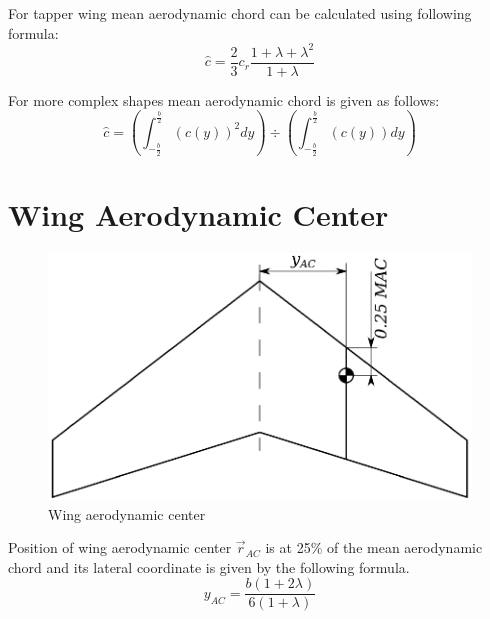 For tapper wing mean aerodynamic chord can be calculated using following formula: \cite{Corke2003, Galinski2016}
\begin{equation}
  \hat c = \frac{2}{3} c_r \frac{1+\lambda+\lambda^2}{1+\lambda}
\end{equation}

For more complex shapes mean aerodynamic chord is given as follows: \cite{Paturski02}
\begin{equation}
  \hat c = 
  \left(
    \int_{-\frac{b}{2}}^{\frac{b}{2}} \left( c \left( y \right) \right)^2 dy
  \right)
  \div
  \left(
    \int_{-\frac{b}{2}}^{\frac{b}{2}} \left( c \left( y \right) \right) dy
  \right)
\end{equation}

\section{Wing Aerodynamic Center}

\begin{figure}
  \centering
  \includegraphics[width=120mm]{eps/wing_aerodynamic_center.eps}
  \caption{Wing aerodynamic center}
\end{figure}

Position of wing aerodynamic center ${\vec r}_{AC}$ is at 25\% of the mean aerodynamic chord and its lateral coordinate is given by the following formula. \cite{Raymer1992, Corke2003, Galinski2016, Torenbeek1982}
\begin{equation}
  y_{AC} =
  \frac{ b \left( 1 + 2 \lambda \right) }{ 6 \left( 1 + \lambda \right) }
\end{equation}
